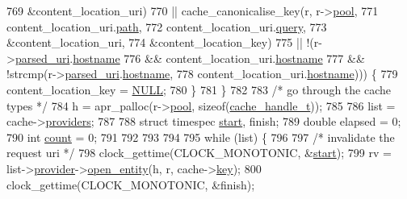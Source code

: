 \begin{DoxyCode}
769                           &content\_location\_uri)
770                 || cache\_canonicalise\_key(r, r->\hyperlink{structrequest__rec_aa0a0c16f9a9ab3901cdb3f3c9c9d83d0}{pool},
771                                           content\_location\_uri.\hyperlink{structapr__uri__t_a61cff1baadb3c1b52a34b502c25bba7f}{path},
772                                           content\_location\_uri.\hyperlink{structapr__uri__t_a88d889bcda9e95696022f04ffb470678}{query},
773                                           &content\_location\_uri,
774                                           &content\_location\_key)
775                 || !(r->\hyperlink{structrequest__rec_a778f7883e201095a1d914ab7422635eb}{parsed\_uri}.\hyperlink{structapr__uri__t_a8c6bf3dfca3d159f091377d9f7228aec}{hostname}
776                      && content\_location\_uri.\hyperlink{structapr__uri__t_a8c6bf3dfca3d159f091377d9f7228aec}{hostname}
777                      && !strcmp(r->\hyperlink{structrequest__rec_a778f7883e201095a1d914ab7422635eb}{parsed\_uri}.\hyperlink{structapr__uri__t_a8c6bf3dfca3d159f091377d9f7228aec}{hostname},
778                                 content\_location\_uri.\hyperlink{structapr__uri__t_a8c6bf3dfca3d159f091377d9f7228aec}{hostname}))) \{
779             content\_location\_key = \hyperlink{pcre_8txt_ad7f989d16aa8ca809a36bc392c07fba1}{NULL};
780         \}
781     \}
782 
783     \textcolor{comment}{/* go through the cache types */}
784     h = apr\_palloc(r->\hyperlink{structrequest__rec_aa0a0c16f9a9ab3901cdb3f3c9c9d83d0}{pool}, \textcolor{keyword}{sizeof}(\hyperlink{structcache__handle}{cache\_handle\_t}));
785 
786     list = cache->\hyperlink{structcache__request__rec_afeb71f387482c679d90de359869b8e10}{providers};
787     
788     \textcolor{keyword}{struct }timespec \hyperlink{group__APACHE__CORE__DAEMON_ga6d3a995932cd00f6b3473898aa90d596}{start}, finish;
789     \textcolor{keywordtype}{double} elapsed = 0;
790     \textcolor{keywordtype}{int} \hyperlink{group__APR__MD5_ga16ff2d8e15ade4948398b0aeb80124a8}{count} = 0;
791     
792 
793 
794 
795     \textcolor{keywordflow}{while} (list) \{
796 
797         \textcolor{comment}{/* invalidate the request uri */}
798     clock\_gettime(CLOCK\_MONOTONIC, &\hyperlink{group__APACHE__CORE__DAEMON_ga6d3a995932cd00f6b3473898aa90d596}{start});
799         rv = list->\hyperlink{structcache__provider__list_a1e1caa5b70698f255962728326dc1be3}{provider}->\hyperlink{structcache__provider_ac99f3fba4c7e207f7a121443f16afe18}{open\_entity}(h, r, cache->\hyperlink{structcache__request__rec_a564726b5f7e5dc4fee2fb01d178677b4}{key});
800     clock\_gettime(CLOCK\_MONOTONIC, &finish);

\end{DoxyCode}
